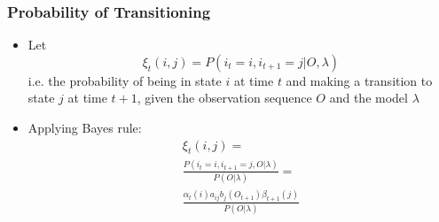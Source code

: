 \documentclass{beamer}
\begin{document}
\begin{frame}
    \frametitle{Probability of Transitioning}
    \begin{itemize}
    \item Let
        \begin{displaymath}
            \xi_t(i,j) = P(i_t = i, i_{t+1} = j|O,\lambda)
        \end{displaymath}
        i.e. the probability of being in state $i$ at time $t$ and making a
        transition to state $j$ at time $t + 1$, given the observation sequence
        $O$ and the model $\lambda$
    \item Applying Bayes rule:
        \begin{multline*}
            \xi_t(i,j) = \\
            \frac{P(i_t = i, i_{t+1} = j,O|\lambda)}{P(O|\lambda)} = \\
            \frac{\alpha_t(i)a_{ij}b_j(O_{t+1})\beta_{t+1}(j)}{P(O|\lambda)}
        \end{multline*}
    \end{itemize}
\end{frame}

\end{document}
